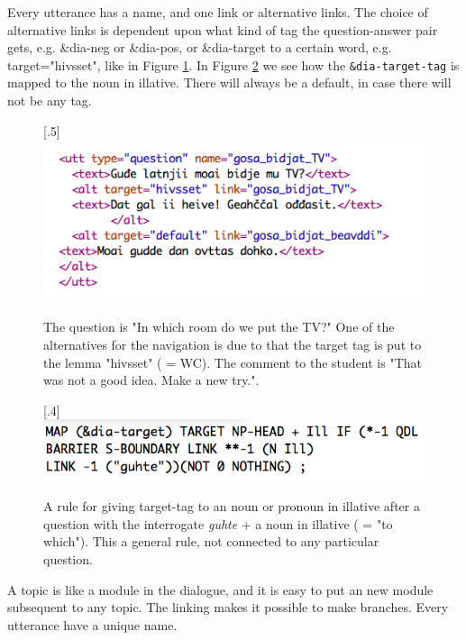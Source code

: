 \documentclass[11pt]{article}
\begin{document}
Every utterance has a name, and one link or alternative links. The choice of alternative links is dependent upon what kind of tag the question-answer pair gets, e.g. \&dia-neg or \&dia-pos, or \&dia-target to a certain word, e.g. target="hivsset", like in Figure \ref{TV}.  In Figure \ref{targetIll} we see how the \texttt{\&dia-target-tag} is mapped to the noun in illative. There will always be a default, in case there will not be any tag. \\

\begin{figure}[htbp]
\begin{center}
\scalebox{.5}[.5]{\includegraphics{presentation/img/gosabidjatTV.png}}
\caption{The question is "In which room do we put the TV?" One of the alternatives for the navigation is due to that the target tag is put to the lemma "hivsset" ( = WC). The comment to the student is "That was not a good idea. Make a new try.".}
\label{TV}
\end{center}
\end{figure}


\begin{figure}[htbp]
\begin{center}
\scalebox{.4}[.4]{\includegraphics{presentation/img/targetIll.png}}
\caption{A rule for giving target-tag to an noun or pronoun in illative after a question with the interrogate \textit{guhte} + a noun in illative ( = "to which"). This a general rule, not connected to any particular question.}
\label{targetIll}
\end{center}
\end{figure}

A topic is like a module in the dialogue, and it is easy to put an new module subsequent to any topic. The linking makes it possible to make branches. Every utterance have a unique name.  
\end{document}
